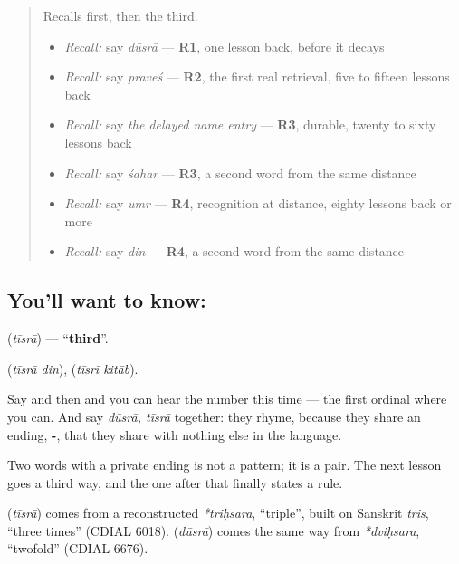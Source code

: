 \begin{quote}
Recalls first, then the third.

\begin{itemize}
\raggedright
  \item \emph{Recall:} say \emph{dūsrā} — \textbf{R1}, one lesson back, before it decays
  \item \emph{Recall:} say \emph{praveś} — \textbf{R2}, the first real retrieval, five to fifteen lessons back
  \item \emph{Recall:} say \emph{the delayed name entry} — \textbf{R3}, durable, twenty to sixty lessons back
  \item \emph{Recall:} say \emph{śahar} — \textbf{R3}, a second word from the same distance
  \item \emph{Recall:} say \emph{umr} — \textbf{R4}, recognition at distance, eighty lessons back or more
  \item \emph{Recall:} say \emph{din} — \textbf{R4}, a second word from the same distance
\end{itemize}
\end{quote}

\subsection*{You'll want to know: }
\textbf{} (\emph{tīsrā}) — \textquotedblleft{}\textbf{third}\textquotedblright{}.

\textbf{ } (\emph{tīsrā din}), \textbf{ } (\emph{tīsrī kitāb}).

Say \textbf{} and then \textbf{} and you can hear the number this time — the first ordinal where you can. And say \emph{dūsrā, tīsrā} together: they rhyme, because they share an ending, \textbf{-}, that they share with nothing else in the language.

Two words with a private ending is not a pattern; it is a pair. The next lesson goes a third way, and the one after that finally states a rule.

\begin{cousinweb}
\textbf{} (\emph{tīsrā}) comes from a reconstructed \emph{*triḥsara}, \textquotedblleft{}triple\textquotedblright{}, built on Sanskrit \emph{tris}, \textquotedblleft{}three times\textquotedblright{} (CDIAL 6018). \textbf{} (\emph{dūsrā}) comes the same way from \emph{*dviḥsara}, \textquotedblleft{}twofold\textquotedblright{} (CDIAL 6676).
\end{cousinweb}

